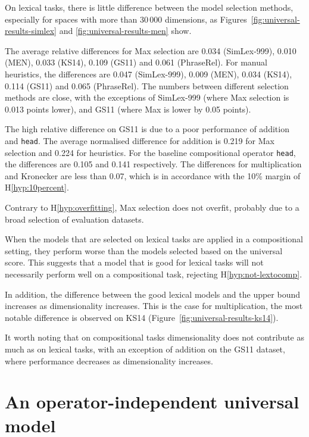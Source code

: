 On lexical tasks, there is little difference between the model selection methods, especially for spaces with more than 30\,000 dimensions, as Figures~\ref{fig:universal-results-simlex} and \ref{fig:universal-results-men} show.

The average relative differences for Max selection are 0.034 (SimLex-999), 0.010 (MEN), 0.033 (KS14), 0.109 (GS11) and 0.061 (PhraseRel). For manual heuristics, the differences are 0.047 (SimLex-999), 0.009 (MEN), 0.034 (KS14), 0.114 (GS11) and 0.065 (PhraseRel). The numbers between different selection methods are close, with the exceptions of SimLex-999 (where Max selection is 0.013 points lower), and GS11 (where Max is lower by 0.05 points).

The high relative difference on GS11 is due to a poor performance of addition and \texttt{head}. The average normalised difference for addition is 0.219 for Max selection and 0.224 for heuristics. For the baseline compositional operator \texttt{head}, the differences are 0.105 and 0.141 respectively. The differences for multiplication and Kronecker are less than 0.07, which is in accordance with the 10\% margin of H\ref{hyp:10percent}.

Contrary to H\ref{hyp:overfitting}, Max selection does not overfit, probably due to a broad selection of evaluation datasets.

When the models that are selected on lexical tasks are applied in a compositional setting, they perform worse than the models selected based on the universal score. This suggests that a model that is good for lexical tasks will not necessarily perform well on a compositional task, rejecting H\ref{hyp:not-lextocomp}.

In addition, the difference between the good lexical models and the upper bound increases as dimensionality increases. This is the case for multiplication, the most notable difference is observed on KS14 (Figure~\ref{fig:universal-results-ks14}).

It worth noting that on compositional tasks dimensionality does not contribute as much as on lexical tasks, with an exception of addition on the GS11 dataset, where performance decreases as dimensionality increases.

\section{An operator-independent universal model}
\label{sec:single}

